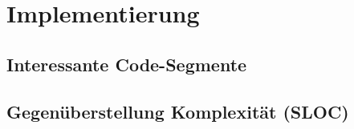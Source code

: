 \chapter{Implementierung}
\label{cha:Implementierung}

\section{Interessante Code-Segmente}

\section{Gegenüberstellung Komplexität (SLOC)}

